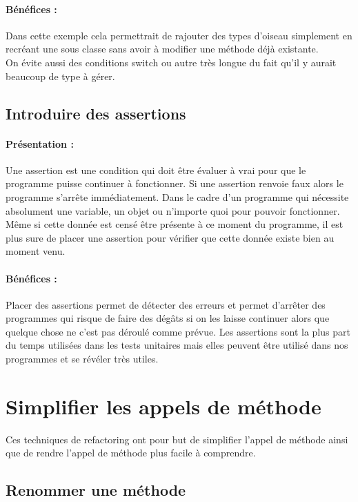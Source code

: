 \documentclass[a4paper,twoside,12pt,openright]{report}
\begin{document}
\paragraph{Bénéfices :}
Dans cette exemple cela permettrait de rajouter des types d'oiseau simplement en recréant une sous classe sans avoir à modifier une méthode déjà existante.\\
On évite aussi des conditions switch ou autre très longue du fait qu'il y aurait beaucoup de type à gérer.\\

\subsection{Introduire des assertions}
\paragraph{Présentation :}
Une assertion est une condition qui doit être évaluer à vrai pour que le programme puisse continuer à fonctionner. Si une assertion renvoie faux alors le programme s'arrête immédiatement.
Dans le cadre d'un programme qui nécessite absolument une variable, un objet ou n'importe quoi pour pouvoir fonctionner. Même si cette donnée est censé être présente à ce moment du programme, il est plus sure de placer une assertion pour vérifier que cette donnée existe bien au moment venu.

\paragraph{Bénéfices :}
Placer des assertions permet de détecter des erreurs et permet d'arrêter des programmes qui risque de faire des dégâts si on les laisse continuer alors que quelque chose ne c'est pas déroulé comme prévue.
Les assertions sont la plus part du temps utilisées dans les tests unitaires mais elles peuvent être utilisé dans nos programmes et se révéler très utiles.\\

\newpage
\section{Simplifier les appels de méthode}
Ces techniques de refactoring ont pour but de simplifier l'appel de méthode ainsi que de rendre l'appel de méthode plus facile à comprendre.\\



\subsection{Renommer une méthode}
\end{document}
